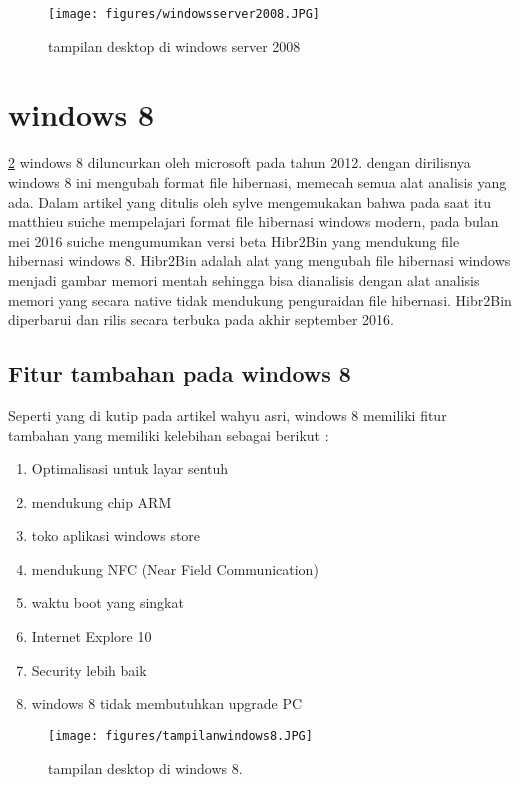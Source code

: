 \begin{figure}[ht]
\centerline{\texttt{[image: figures/windowsserver2008.JPG]}}
\caption{tampilan desktop di windows server 2008}
\label{windowsserver2008}
\end{figure}
	\section{windows 8}
		\ref{tampilanwindows8} windows 8 diluncurkan oleh microsoft pada tahun 2012. dengan dirilisnya windows 8 ini mengubah format file hibernasi, memecah semua alat analisis yang ada.
		Dalam artikel yang ditulis oleh sylve mengemukakan bahwa pada saat itu matthieu suiche mempelajari format file hibernasi windows modern, pada bulan mei 2016 suiche mengumumkan versi beta Hibr2Bin yang mendukung file hibernasi windows 8. Hibr2Bin adalah alat yang mengubah file hibernasi windows menjadi gambar memori mentah sehingga bisa dianalisis dengan alat analisis memori yang secara native tidak mendukung penguraidan file hibernasi. Hibr2Bin diperbarui dan rilis secara terbuka pada akhir september 2016. \cite{sylve2017modern}
		\subsection{Fitur tambahan pada windows 8}
			Seperti yang di kutip pada artikel wahyu asri, windows 8 memiliki fitur tambahan yang memiliki kelebihan sebagai berikut :
\begin{enumerate}
			\item Optimalisasi untuk layar sentuh
			\item mendukung chip ARM
			\item toko aplikasi windows store
			\item mendukung NFC (Near Field Communication)
			\item waktu boot yang singkat
			\item Internet Explore 10
			\item Security lebih baik
			\item windows 8 tidak membutuhkan upgrade PC \cite{wahyu8review}
\end{enumerate}
\begin{figure}[ht]
\centerline{\texttt{[image: figures/tampilanwindows8.JPG]}}
\caption{tampilan desktop di windows 8.}
\label{tampilanwindows8}
\end{figure}


